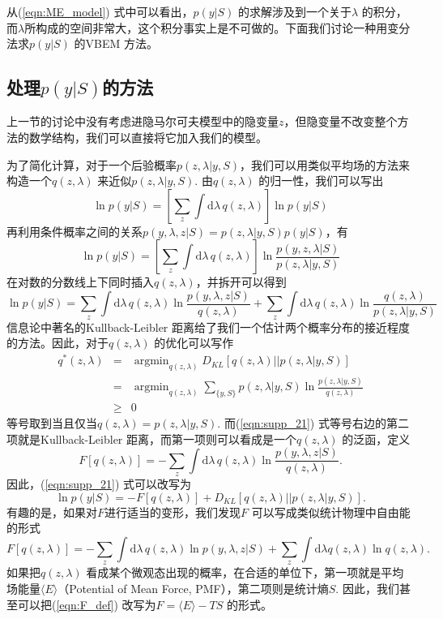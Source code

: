 \documentclass[11pt, a4paper]{article}
\DeclareMathOperator*{\argmin}{argmin}
\begin{document}
    从(\ref{eqn:ME_model}) 式中可以看出，$p(y|S)$ 的求解涉及到一个关于$\lambda$ 的积分，而$\lambda$所构成的空间非常大，这个积分事实上是不可做的。下面我们讨论一种用变分法求$p(y|S)$ 的VBEM 方法。

    \subsection{处理$p(y|S)$的方法}
    上一节的讨论中没有考虑进隐马尔可夫模型中的隐变量$z$，但隐变量不改变整个方法的数学结构，我们可以直接将它加入我们的模型。

    为了简化计算，对于一个后验概率$p(z,\lambda|y, S)$，我们可以用类似平均场的方法来构造一个$q(z,\lambda)$ 来近似$p(z,\lambda|y, S)$. 由$q(z,\lambda)$ 的归一性，我们可以写出
    $$\ln p(y|S) = \left[\sum_z\int \mathrm d\lambda\, q(z,\lambda)\right]\ln p(y|S)$$
    再利用条件概率之间的关系$p(y,\lambda,z|S) = p(z,\lambda|y, S)p(y|S)$，有
    $$\ln p(y|S) = \left[\sum_z\int \mathrm d\lambda\, q(z,\lambda)\right]\ln \frac{p(y,z,\lambda|S)}{p(z,\lambda|y,S)}$$
    在对数的分数线上下同时插入$q(z,\lambda)$，并拆开可以得到
    \begin{equation}\label{eqn:supp_21}
      \ln p(y|S) = \sum_z\int \mathrm d\lambda\, q(z,\lambda)\ln\frac{p(y,\lambda,z|S)}{q(z,\lambda)}+\sum_z\int \mathrm d\lambda\, q(z,\lambda)\ln\frac{q(z,\lambda)}{p(z,\lambda|y,S)}
    \end{equation}
    信息论中著名的Kullback-Leibler 距离给了我们一个估计两个概率分布的接近程度的方法。因此，对于$q(z,\lambda)$ 的优化可以写作
    \begin{eqnarray*}
      q^*(z,\lambda) &=& \argmin_{q(z,\lambda)} D_{KL}[q(z,\lambda) || p(z,\lambda|y,S)] \\
                    &=& \argmin_{q(z,\lambda)}\sum_{\{y,S\}} p(z,\lambda|y,S)\ln\frac{p(z,\lambda|y,S)}{q(z,\lambda)}\\
                    &\ge& 0
    \end{eqnarray*}
    等号取到当且仅当$q(z,\lambda) = p(z,\lambda|y, S)$. 而(\ref{eqn:supp_21}) 式等号右边的第二项就是Kullback-Leibler 距离，而第一项则可以看成是一个$q(z,\lambda)$ 的泛函，定义
    \begin{equation}\label{eqn:F_def}
      F[q(z,\lambda)] = -\sum_z\int \mathrm d\lambda\, q(z,\lambda)\ln\frac{p(y,\lambda,z|S)}{q(z,\lambda)}.
    \end{equation}
    因此，(\ref{eqn:supp_21}) 式可以改写为
    \begin{equation}\label{eqn:supp_24}
      \ln p(y|S)= -F[q(z,\lambda)] +D_{KL}[q(z,\lambda)||p(z,\lambda| y, S)].
    \end{equation}
    有趣的是，如果对$F$进行适当的变形，我们发现$F$ 可以写成类似统计物理中自由能的形式
    \begin{equation}\label{eqn:supp_25}
	F[q(z,\lambda)] = -\sum_z\int \mathrm d\lambda\, q(z,\lambda)\ln p(y,\lambda,z|S) + \sum_z\int \mathrm d\lambda q(z,\lambda)\ln q(z,\lambda).
	\end{equation}    
如果把$q(z,\lambda)$ 看成某个微观态出现的概率，在合适的单位下，第一项就是平均场能量$\langle E\rangle$（Potential of Mean Force, PMF），第二项则是统计熵$S$. 因此，我们甚至可以把(\ref{eqn:F_def}) 改写为$F=\langle E\rangle -TS$ 的形式。
\end{document}

